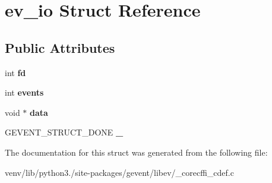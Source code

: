 \hypertarget{structev__io}{}\section{ev\+\_\+io Struct Reference}
\label{structev__io}
\subsection*{Public Attributes}
\begin{DoxyCompactItemize}
\item 
\mbox{\label{structev__io_a5c7e481bb08731a54a00c341d3fccb69}} 
int {\bfseries fd}
\item 
\mbox{\label{structev__io_a439e3de48a504c0a64cc710338ce1349}} 
int {\bfseries events}
\item 
\mbox{\label{structev__io_a5c1a82bcc95a58cf86868b5a3e711672}} 
void $\ast$ {\bfseries data}
\item 
\mbox{\label{structev__io_a7f34b2afaf13075526e34be93bf2f6e7}} 
G\+E\+V\+E\+N\+T\+\_\+\+S\+T\+R\+U\+C\+T\+\_\+\+D\+O\+NE {\bfseries \+\_\+}
\end{DoxyCompactItemize}


The documentation for this struct was generated from the following file\+:\begin{DoxyCompactItemize}
\item 
venv/lib/python3./site-\/packages/gevent/libev/\+\_\+corecffi\+\_\+cdef.\+c\end{DoxyCompactItemize}
